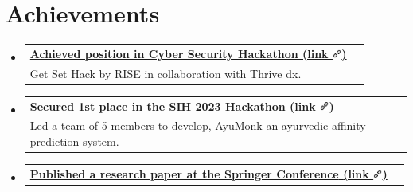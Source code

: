 \documentclass[a4paper,11pt]{article}
\makeatletter
\newcommand{\resumePOR}[3]{
\vspace{0.5mm}\item
    \begin{tabular*}{0.97\textwidth}[t]{l@{\extracolsep{\fill}}r}
        \textbf{#1}\hspace{0.3mm}#2 & \textit{\small{#3}} 
    \end{tabular*}
    \vspace{-2mm}
}
\newcommand{\resumeSubHeadingListStart}{\begin{itemize}[leftmargin=*,labelsep=0mm]}
\newcommand{\resumeSubHeadingListEnd}{\end{itemize}\vspace{2mm}}
\newcommand{\customtext}[1]{{\sffamily\bfseries #1}}
\makeatother
\begin{document}
\section{\textbf{Achievements}}
\vspace{-0.4mm}
\resumeSubHeadingListStart
 
\resumePOR{  \href{https://drive.google.com/file/d/1Tpn3K8eK5zJWloIA06yOFw7PCoLqy-3t/view}{Achieved \thinspace{\customtext{\textbf{\textcolor{sand}{5th}}}} position in Cyber Security Hackathon {\color{gray}\textbf{(link \includegraphics[width=0.3cm,clip]{url.png})}}} } %
    {\\ \thinspace \thinspace Get Set Hack by RISE in collaboration with Thrive dx.} %
    {} %
    
\vspace{-1.5mm}
\resumePOR{  \href{https://drive.google.com/file/d/1lbA1B5IqrB63UNGqP2AWA_5tU-p_JPjT/view}{{Secured \customtext{\textbf{\textcolor{sand}{1st}}}} place in the {\customtext{\textbf{\textcolor{sand}{SIH 2023}}}} Hackathon {\color{gray}\textbf{(link \includegraphics[width=0.3cm,clip]{url.png})}}} } %
    {\\ \thinspace \thinspace Led a team of 5 members to develop, AyuMonk an ayurvedic affinity prediction system.} %
    {} %
    
    \vspace{-1.5mm}
    \resumePOR{  \href{https://drive.google.com/file/d/1jHHO7sfI8_siICWUdF21CH2A8n44mG2_/view?usp=sharing}{Published a research paper at the {\customtext{\textbf{\textcolor{sand}{Springer Conference}}}} {\color{gray}\textbf{(link \includegraphics[width=0.3cm,clip]{url.png})}}} } %
    {} %
    {} %

\resumeSubHeadingListEnd
\vspace{-4.4mm}

\end{document}
